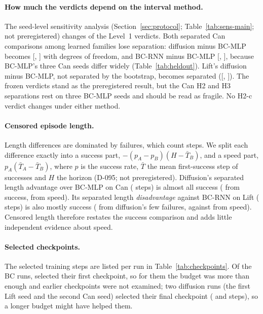 \paragraph{How much the verdicts depend on the interval method.} The seed-level sensitivity
analysis (Section~\ref{sec:protocol}; Table~\ref{tab:sens-main}; not preregistered) changes
 of the  Level~1 verdicts. Both separated Can comparisons
among learned families lose separation: diffusion minus BC-MLP becomes
[, ] with
 degrees of freedom, and BC-RNN minus BC-MLP
[, ], because BC-MLP's three
Can seeds differ widely (Table~\ref{tab:heldout}). Lift's diffusion minus BC-MLP, not
separated by the bootstrap, becomes separated ([,
]). The frozen verdicts stand as the preregistered result, but
the Can H2 and H3 separations rest on three BC-MLP seeds and should be read as fragile. No
H2-c verdict changes under either method.

\paragraph{Censored episode length.} Length differences are dominated by failures, which
count  steps. We split each difference exactly into a success part,
$-(p_A - p_B)(H - \bar T_B)$, and a speed part, $p_A(\bar T_A - \bar T_B)$, where $p$ is the
success rate, $\bar T$ the mean first-success step of successes and $H$ the horizon (D-095;
not preregistered). Diffusion's separated length advantage over BC-MLP on Can
( steps) is almost all success (
from success,  from speed). Its separated length
\emph{disadvantage} against BC-RNN on Lift ( steps) is also
mostly success ( from diffusion's few failures, against
 from speed). Censored length therefore restates the
success comparison and adds little independent evidence about speed.

\paragraph{Selected checkpoints.} The selected training steps are listed per run in
Table~\ref{tab:checkpoints}. Of the  BC runs,  selected
their first checkpoint, so for them the budget was more than enough and earlier checkpoints
were not examined; two diffusion runs (the first Lift seed and the second Can seed) selected their final
checkpoint ( and  steps), so a longer budget
might have helped them.

